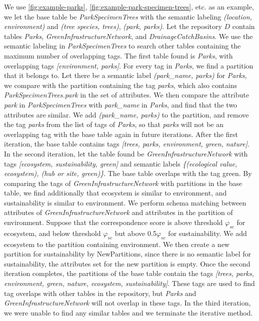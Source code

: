 We use \autoref{fig:example-parks}, \autoref{fig:example-park-specimen-trees}, etc. as an example, we let the base table be \textit{ParkSpecimenTrees} with the semantic labeling \textit{(location, environment)} and \textit{(tree species, trees)}, \textit{(park, parks)}. Let the repository $D$ contain tables \textit{Parks}, \textit{GreenInfrastructureNetwork}, and \textit{DrainageCatchBasins}. We use the semantic labeling in \textit{ParkSpecimenTrees} to search other tables containing the maximum number of overlapping tags. The first table found is \textit{Parks}, with overlapping tags \textit{[environment, parks]}. For every tag in \textit{Parks}, we find a partition that it belongs to. Let there be a semantic label \textit{(park\_name, parks)} for \textit{Parks}, we compare with the partition containing the tag \textit{parks}, which also contains \textit{ParkSpecimenTrees.park} in the set of attributes. We then compare the attribute \textit{park} in \textit{ParkSpecimenTrees} with \textit{park\_name} in \textit{Parks}, and find that the two attributes are similar. We add \textit{(park\_name, parks)} to the partition, and remove the tag \textit{parks} from the list of tags of \textit{Parks}, so that \textit{parks} will not be an overlapping tag with the base table again in future iterations. After the first iteration, the base table contains tags \textit{[trees, parks, environment, green, nature]}. In the second iteration, let the table found be \textit{GreenInfrastructureNetwork} with tags \textit{[ecosystem, sustainability, green]} and semantic labels \textit{\{(ecological value, ecosystem), (hub or site, green)\}}. The base table overlaps with the tag green. By comparing the tags of \textit{GreenInfrastructureNetwork} with partitions in the base table, we find additionally that ecosystem is similar to environment, and sustainability is similar to environment. We perform schema matching between attributes of \textit{GreenInfrastructureNetwork} and attributes in the partition of environment. Suppose that the correspondence score is above threshold $\ensuremath{\varphi}_{sc}$ for ecosystem, and below threshold $\ensuremath{\varphi}_{sc}$ but above 0.5$\ensuremath{\varphi}_{sc}$ for sustainability. We add ecosystem to the partition containing environment. We then create a new partition for sustainability by NewPartitions, since there is no semantic label for sustainability, the attributes set for the new partition is empty. Once the second iteration completes, the partitions of the base table contain the tags \textit{[trees, parks, environment, green, nature, ecosystem, sustainability]}. These tags are used to find tag overlaps with other tables in the repository, but \textit{Parks} and \textit{GreenInfrastructureNetwork} will not overlap in these tags. In the third iteration, we were unable to find any similar tables and we terminate the iterative method.

